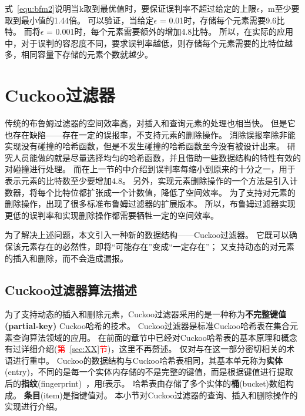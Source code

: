 式~\ref{equ:bfm2}说明当k取到最优值时，要保证误判率不超过给定的上限\begin{math}\epsilon\end{math}，m至少要取到最小值的1.44倍。
可以验证，当给定\begin{math}\epsilon\end{math} = 0.01时，存储每个元素需要9.6比特。
而将\begin{math}\epsilon\end{math} = 0.001时，每个元素需要额外的增加4.8比特。
所以，在实际的应用中，对于误判的容忍度不同，要求误判率越低，则存储每个元素需要的比特位越多，相同容量下存储的元素个数就越少。

\section{Cuckoo过滤器}
传统的布鲁姆过滤器的空间效率高，对插入和查询元素的处理也相当快。
但是它也存在缺陷——存在一定的误报率，不支持元素的删除操作。
消除误报率除非能实现没有碰撞的哈希函数，但是不发生碰撞的哈希函数至今没有被设计出来。
研究人员能做的就是尽量选择均匀的哈希函数，并且借助一些数据结构的特性有效的对碰撞进行处理。
而在上一节的中介绍到误判率每缩小到原来的十分之一，用于表示元素的比特数至少要增加4.8。
另外，实现元素删除操作的一个方法是引入计数器，将每个比特位都扩张成一个计数值，降低了空间效率。
为了支持对元素的删除操作，出现了很多标准布鲁姆过滤器的扩展版本\cite{bender2012don,bonomi2006improved,fan2000summary}。
所以，布鲁姆过滤器实现更低的误判率和实现删除操作都需要牺牲一定的空间效率。

为了解决上述问题，本文引入一种新的数据结构——Cuckoo过滤器。
它既可以确保该元素存在的必然性，即将“可能存在”变成“一定存在”；
又支持动态的对元素的插入和删除，而不会造成漏报。

\subsection{Cuckoo过滤器算法描述}
为了支持动态的插入和删除元素，Cuckoo过滤器采用的是一种称为\textbf{不完整键值(partial-key)} Cuckoo哈希的技术。
Cuckoo过滤器是标准Cuckoo哈希表在集合元素查询算法领域的应用。
在前面的章节中已经对Cuckoo哈希表的基本原理和概念有过详细介绍(\textcolor{red}{第~\ref{sec:XX}节})，这里不再赘述。
仅对与在这一部分密切相关的术语进行重申。
Cuckoo的数据结构与Cuckoo哈希表相同，其基本单元称为\textbf{实体}(entry)，不同的是每一个实体内存储的不是完整的键值，而是根据键值进行提取后的\textbf{指纹}(fingerprint)~\cite{memc3}，用f表示。
哈希表由存储了多个实体的\textbf{桶}(bucket)数组构成。
\textbf{条目}(item)是指键值对。
本小节对Cuckoo过滤器的查询、插入和删除操作的实现进行介绍。


